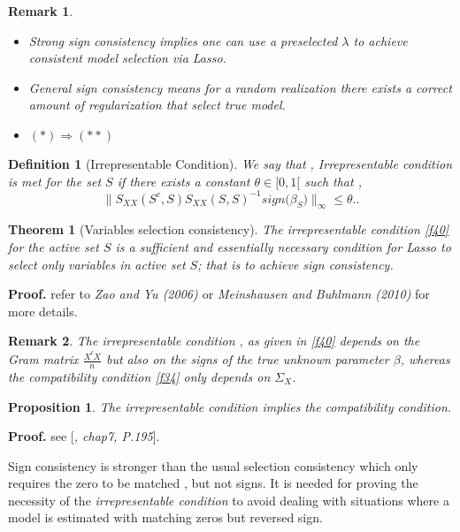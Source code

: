 \documentclass[12pt]{report}
\newtheorem{theoreme}{Theorem}[section] %
\newtheorem {proposition}{Proposition}[section]  %
\newtheorem {definition}{Definition}[section] %
\newtheorem{remarque}{Remark}[section]
\begin{document}
\begin{remarque}
	\begin{itemize}
		\item Strong sign consistency implies one can use a preselected $\lambda$ to achieve consistent model selection via Lasso.
		\item General sign consistency means for a random realization there exists a correct amount of regularization that select true model.
		\item $(\ast) \Rightarrow (\ast \ast)$
	\end{itemize}
\end{remarque}
\begin{definition}[Irrepresentable Condition]
	We say that , Irrepresentable condition is met for the set $S$ if there exists a constant $\theta \in [0,1[$ such that ,
	\begin{equation}
		\parallel S_{XX}(S^{c},S)S_{XX}(S,S)^{-1}sign\big(\beta_{S}\big)\parallel_{\infty}\leq \theta.
		\label{f40}.
	\end{equation}
\end{definition}

\begin{theoreme}[Variables selection consistency]
	The irrepresentable condition \eqref{f40} for the active set $S$ is a sufficient and essentially necessary condition for Lasso to select only variables in active set $S$; that is to achieve sign consistency.
\end{theoreme}
\textbf{Proof.} refer to \textit{Zao and Yu (2006) \cite{nref15}} or \textit{Meinshausen and Buhlmann (2010)} for more details.

\begin{remarque}
The irrepresentable condition , as given in \eqref{f40} depends on the Gram matrix $\frac{X^{t}X}{n}$ but also on the signs of the true unknown parameter $\beta$, whereas the compatibility condition \eqref{f34} only depends on $\Sigma_{X}$.
\end{remarque}
\begin{proposition}
	The irrepresentable condition implies the compatibility condition.
\end{proposition}
\textbf{Proof.} see [\textit{\cite{nref14}, chap7, P.195}].

Sign consistency is stronger than the usual selection consistency  which only requires the zero to be matched , but not signs. It is needed for proving the necessity of the \textit{irrepresentable condition} to avoid dealing with situations where a model is estimated with matching zeros but reversed sign.
	
\end{document}
